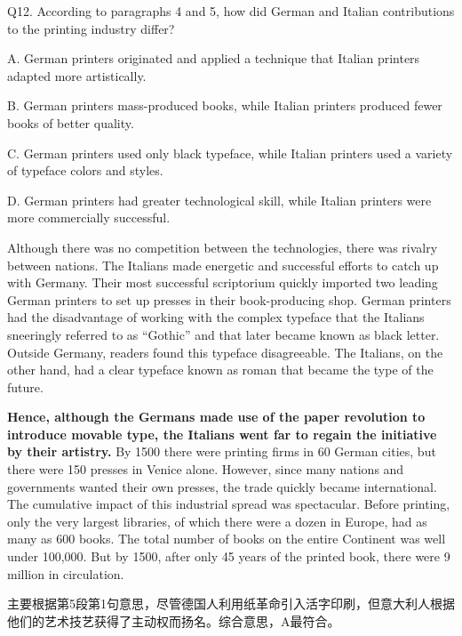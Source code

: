 \begin{blk}
    \begin{qst}
        Q12. According to paragraphs 4 and 5, how did German and Italian contributions to the printing industry differ?
    \end{qst}

    \begin{chc}
        A. German printers originated and applied a technique that Italian printers adapted more artistically.

        B. German printers mass-produced books, while Italian printers produced fewer books of better quality.

        C. German printers used only black typeface, while Italian printers used a variety of typeface colors and styles.

        D. German printers had greater technological skill, while Italian printers were more commercially successful.
    \end{chc}

    \begin{psgq}
        Although there was no competition between the technologies, there was rivalry between nations. The Italians made energetic and successful efforts to catch up with Germany. Their most successful scriptorium quickly imported two leading German printers to set up presses in their book-producing shop. German printers had the disadvantage of working with the complex typeface that the Italians sneeringly referred to as “Gothic” and that later became known as black letter. Outside Germany, readers found this typeface disagreeable. The Italians, on the other hand, had a clear typeface known as roman that became the type of the future.

        \textbf{Hence, although the Germans made use of the paper revolution to introduce movable type, the Italians went far to regain the initiative by their artistry.} By 1500 there were printing firms in 60 German cities, but there were 150 presses in Venice alone. However, since many nations and governments wanted their own presses, the trade quickly became international. The cumulative impact of this industrial spread was spectacular. Before printing, only the very largest libraries, of which there were a dozen in Europe, had as many as 600 books. The total number of books on the entire Continent was well under 100,000. But by 1500, after only 45 years of the printed book, there were 9 million in circulation.
    \end{psgq}

    \begin{nlz}
        主要根据第5段第1句意思，尽管德国人利用纸革命引入活字印刷，但意大利人根据他们的艺术技艺获得了主动权而扬名。综合意思，A最符合。
    \end{nlz}
\end{blk}

